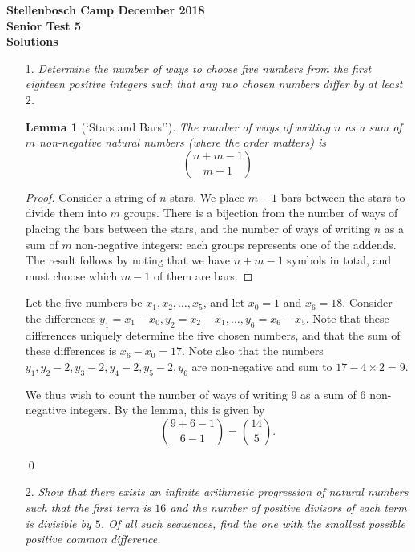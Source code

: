 \documentclass[a4paper, 12pt]{article}
\newtheorem{lemma}{Lemma}
\begin{document}
\begin{center}
\textbf{Stellenbosch Camp December 2018 \\ Senior Test 5} \\
\textbf{Solutions}
\end{center}
\vspace{5mm}

\begin{enumerate}
    
\item[1.]  \textit{Determine the number of ways to choose five numbers from the first eighteen positive integers such that any two chosen numbers differ by at least $2$.}

\begin{lemma}[`Stars and Bars'']
The number of ways of writing $n$ as a sum of $m$ non-negative natural numbers (where the order matters) is
\[
	\binom{n + m - 1}{m - 1}
\]
\end{lemma}
\begin{proof}
Consider a string of $n$ stars. We place $m - 1$ bars between the stars to divide them into $m$ groups. There is a bijection from the number of ways of placing the bars between the stars, and the number of ways of writing $n$ as a sum of $m$ non-negative integers: each groups represents one of the addends. The result follows by noting that we have $n + m - 1$ symbols in total, and must choose which $m - 1$ of them are bars.
\end{proof}

Let the five numbers be $x_1, x_2, \dots, x_5$, and let $x_0 = 1$ and $x_6 = 18$. Consider the differences $y_1 = x_1 - x_0, y_2 = x_2 - x_1, \dots, y_6 = x_6 - x_5$. Note that these differences uniquely determine the five chosen numbers, and that the sum of these differences is $x_6 - x_0 = 17$. Note also that the numbers $y_1, y_2 - 2, y_3 - 2, y_4 - 2, y_5 - 2, y_6$ are non-negative and sum to $17 - 4 \times 2 = 9$.

We thus wish to count the number of ways of writing $9$ as a sum of $6$ non-negative integers. By the lemma, this is given by
\[
	\binom{9 + 6 - 1}{6 - 1} = \binom{14}{5}.
\]

\qed


\vspace{5mm}
\item[2.]  \textit{Show that there exists an infinite arithmetic progression of natural numbers such that the first term is $16$ and the number of positive divisors of each term is divisible by $5$. Of all such sequences, find the one with the smallest possible positive common difference.}


\end{enumerate}
\end{document}

